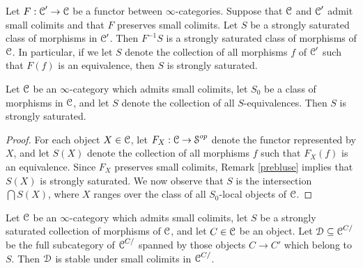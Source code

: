 \begin{remark}\label{prebluse}
Let $F: \operatorname{\mathcal{C}}' \rightarrow \operatorname{\mathcal{C}}$ be a functor between $\infty$-categories. Suppose that $\operatorname{\mathcal{C}}$ and $\operatorname{\mathcal{C}}'$ admit small colimits and that $F$ preserves small colimits. Let $S$ be a strongly saturated class of morphisms in $\operatorname{\mathcal{C}}'$. Then $F^{-1} S$ is a strongly saturated class of morphisms of $\operatorname{\mathcal{C}}$. In particular, if we let $S$ denote the collection of all morphisms $f$ of $\operatorname{\mathcal{C}}'$ such that $F(f)$ is an equivalence, then $S$ is strongly saturated.
\end{remark}

\begin{lemma}\label{bluh}
Let $\operatorname{\mathcal{C}}$ be an $\infty$-category which admits small colimits, let $S_0$ be a class of morphisms
in $\operatorname{\mathcal{C}}$, and let $S$ denote the collection of all $S$-equivalences. Then $S$ is strongly saturated.
\end{lemma}

\begin{proof}
For each object $X \in \operatorname{\mathcal{C}}$, let $F_X: \operatorname{\mathcal{C}} \rightarrow \operatorname{\mathcal{S}}^{op}$ denote the functor
represented by $X$, and let $S(X)$ denote the collection of all morphisms $f$ such
that $F_X(f)$ is an equivalence. Since $F_X$ preserves small colimits, Remark \ref{prebluse} implies that $S(X)$ is strongly saturated. We now observe that $S$ is the intersection $\bigcap S(X)$, where $X$ ranges over the class of all $S_0$-local objects of $\operatorname{\mathcal{C}}$.
\end{proof}

\begin{lemma}\label{yorkan}
Let $\operatorname{\mathcal{C}}$ be an $\infty$-category which admits small colimits, let $S$ be a strongly saturated collection of morphisms of $\operatorname{\mathcal{C}}$, and let $C \in \operatorname{\mathcal{C}}$ be an object. Let $\operatorname{\mathcal{D}} \subseteq \operatorname{\mathcal{C}}^{C/}$ be the full subcategory of $\operatorname{\mathcal{C}}^{C/}$ spanned by those objects $C \rightarrow C'$ which belong to $S$. Then $\operatorname{\mathcal{D}}$ is stable under small colimits in $\operatorname{\mathcal{C}}^{C/}$.
\end{lemma}

